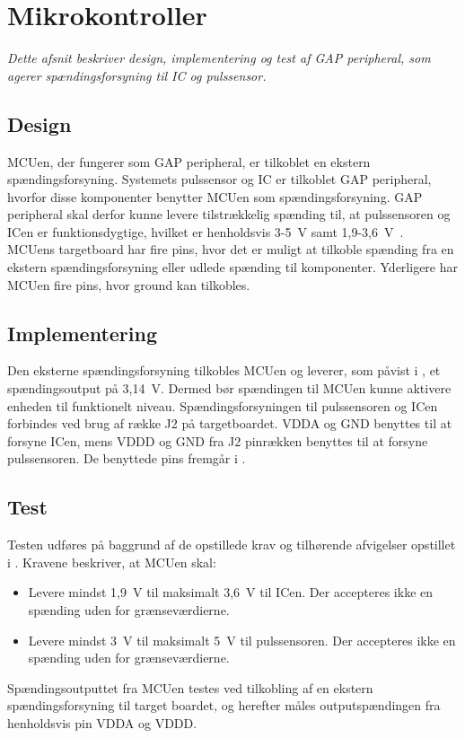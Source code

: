 \section{Mikrokontroller}
\textit{Dette afsnit beskriver design, implementering og test af GAP peripheral, som agerer spændingsforsyning til IC og pulssensor.}

\subsection{Design}
MCUen, der fungerer som GAP peripheral, er tilkoblet en ekstern spændingsforsyning. Systemets pulssensor og IC er tilkoblet GAP peripheral, hvorfor disse komponenter benytter MCUen som spændingsforsyning. GAP peripheral skal derfor kunne levere tilstrækkelig spænding til, at pulssensoren og ICen er funktionsdygtige, hvilket er henholdsvis 3-5~V samt 1,9-3,6~V~\citep{Jimb02016,Murphy2016}. \\
MCUens targetboard har fire pins, hvor det er muligt at tilkoble spænding fra en ekstern spændingsforsyning eller udlede spænding til komponenter. Yderligere har MCUen fire pins, hvor ground kan tilkobles. \citep{Semiconductor2016}

\subsection{Implementering}
Den eksterne spændingsforsyning tilkobles MCUen og leverer, som påvist i , et spændingsoutput på 3,14~V. Dermed bør spændingen til MCUen kunne aktivere enheden til funktionelt niveau.
Spændingsforsyningen til pulssensoren og ICen forbindes ved brug af række J2 på targetboardet. VDDA og GND benyttes til at forsyne ICen, mens VDDD og GND fra J2 pinrækken benyttes til at forsyne pulssensoren. De benyttede pins fremgår i .

\subsection{Test}
Testen udføres på baggrund af de opstillede krav og tilhørende afvigelser opstillet i . Kravene beskriver, at MCUen skal:
\begin{itemize}
	\item Levere mindst 1,9~V til maksimalt 3,6~V til ICen. Der accepteres ikke en spænding uden for grænseværdierne.
	\item Levere mindst 3~V til maksimalt 5~V til pulssensoren. Der accepteres ikke en spænding uden for grænseværdierne.
\end{itemize}
Spændingsoutputtet fra MCUen testes ved tilkobling af en ekstern spændingsforsyning til target boardet, og herefter måles outputspændingen fra henholdsvis pin VDDA og VDDD.

